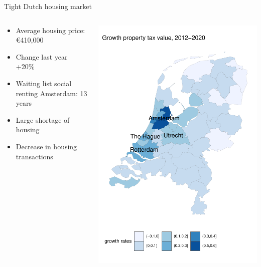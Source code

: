 \documentclass{beamer}
\begin{document}
\begin{frame}{Tight Dutch housing market}
	\begin{columns}
		\begin{column}{0.5\textwidth}
			\begin{itemize}
				\item Average housing price: \euro 410,000 \newline
				\item Change last year +20\% \newline
				\item \alert{Waiting list} social renting Amsterdam: 13 years \newline
				\item Large \alert{shortage} of housing \newline
				\item Decrease in housing \alert{transactions}
			\end{itemize}
		\end{column}
		\begin{column}{0.5\textwidth}
			\begin{center}
				\includegraphics[width=1\textwidth]{../../fig/growth_woz}
			\end{center}
		\end{column}
	\end{columns}
\end{frame}
\end{document}
